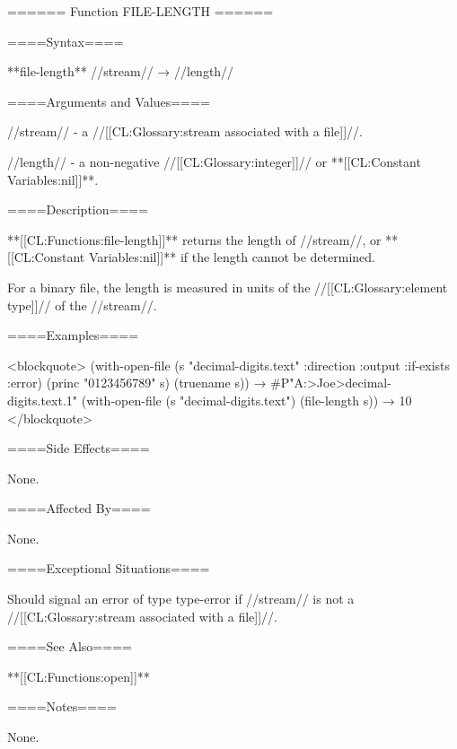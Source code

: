 ====== Function FILE-LENGTH ======

====Syntax====

**file-length** //stream// → //length//

====Arguments and Values====

//stream// - a //[[CL:Glossary:stream associated with a file]]//.

//length// - a non-negative //[[CL:Glossary:integer]]// or **[[CL:Constant Variables:nil]]**.

====Description====

**[[CL:Functions:file-length]]** returns the length of //stream//, or **[[CL:Constant Variables:nil]]** if the length cannot be determined.

For a binary file, the length is measured in units of the //[[CL:Glossary:element type]]// of the //stream//.

====Examples====

<blockquote> (with-open-file (s "decimal-digits.text" :direction :output :if-exists :error) (princ "0123456789" s) (truename s)) → #P"A:>Joe>decimal-digits.text.1" (with-open-file (s "decimal-digits.text") (file-length s)) → 10 </blockquote>

====Side Effects====

None.

====Affected By====

None.

====Exceptional Situations====

Should signal an error of type type-error if //stream// is not a //[[CL:Glossary:stream associated with a file]]//.

====See Also====

**[[CL:Functions:open]]**

====Notes====

None.

